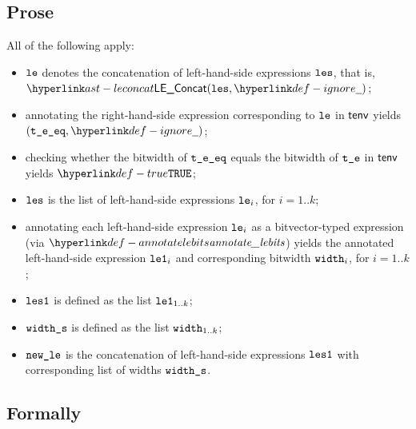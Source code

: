 \subsection{Prose}
All of the following apply:
\begin{itemize}
  \item $\vle$ denotes the concatenation of left-hand-side expressions $\les$, that is, \\ $\LEConcat(\les, \Ignore)$;
  \item annotating the right-hand-side expression corresponding to $\vle$ in $\tenv$ yields \\ $(\vteeq, \Ignore)$\ProseOrTypeError;
  \item checking whether the bitwidth of $\vteeq$ equals the bitwidth of $\vte$ in $\tenv$ yields $\True$\ProseOrTypeError;
  \item $\les$ is the list of left-hand-side expressions $\vle_i$, for $i=1..k$;
  \item annotating each left-hand-side expression $\vle_i$ as a bitvector-typed expression (via $\annotatelebits$)
        yields the annotated left-hand-side expression $\vleone_i$ and corresponding bitwidth $\width_i$, for $i=1..k$;
  \item $\lesone$ is defined as the list $\vleone_{1..k}$;
  \item $\widths$ is defined as the list $\width_{1..k}$;
  \item $\newle$ is the concatenation of left-hand-side expressions $\lesone$ with corresponding list of widths $\widths$.
\end{itemize}



\subsection{Formally}
\begin{mathpar}
\end{mathpar}

